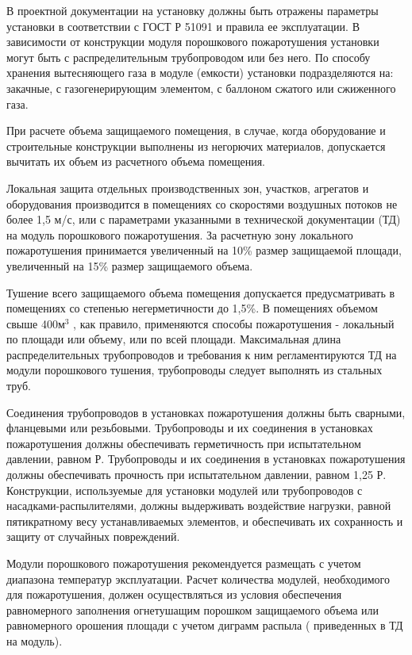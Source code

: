 В проектной документации на установку должны быть отражены параметры установки в соответствии с ГОСТ Р 51091 и правила ее эксплуатации.
В зависимости от конструкции модуля порошкового пожаротушения установки могут быть с распределительным трубопроводом или без него.
По способу хранения вытесняющего газа в модуле (емкости) установки подразделяются на: закачные, с газогенерирующим элементом, с
баллоном сжатого или сжиженного газа.

При расчете объема защищаемого помещения, в случае, когда оборудование и строительные конструкции выполнены из негорючих материалов,
допускается вычитать их объем из расчетного объема помещения.

Локальная защита отдельных производственных зон, участков, агрегатов и оборудования производится в помещениях со скоростями
воздушных потоков не более 1,5 м/с, или с параметрами указанными в технической документации (ТД) на модуль порошкового пожаротушения.
За расчетную зону локального пожаротушения принимается увеличенный на 10\% размер защищаемой площади, увеличенный на 15\%
размер защищаемого объема.

Тушение всего защищаемого объема помещения допускается предусматривать в помещениях со степенью негерметичности до 1,5\%.
В помещениях объемом свыше 400м$^3$ , как правило, применяются способы пожаротушения - локальный по площади или объему, или
по всей площади. Максимальная длина распределительных трубопроводов и требования к ним регламентируются ТД на модули порошкового
тушения, трубопроводы следует выполнять из стальных труб.

Соединения трубопроводов в установках пожаротушения должны быть сварными, фланцевыми или резьбовыми. Трубопроводы и их соединения
в установках пожаротушения должны обеспечивать герметичность при испытательном давлении, равном Р. Трубопроводы и их соединения
в установках пожаротушения должны обеспечивать прочность при испытательном давлении, равном 1,25 Р. Конструкции,
используемые для установки модулей или трубопроводов с насадками-распылителями, должны выдерживать воздействие нагрузки,
равной пятикратному весу устанавливаемых элементов, и обеспечивать их сохранность и защиту от случайных повреждений.

Модули порошкового пожаротушения рекомендуется размещать с учетом диапазона температур эксплуатации.
Расчет количества модулей, необходимого для пожаротушения, должен осуществляться из условия обеспечения равномерного заполнения
огнетушащим порошком защищаемого объема или равномерного орошения площади с учетом диграмм распыла ( приведенных в ТД на модуль).

